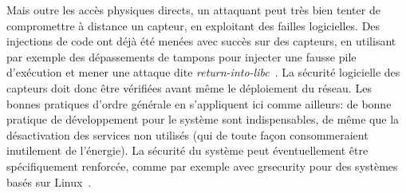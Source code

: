 Mais outre les accès physiques directs, un attaquant peut très bien tenter de compromettre à distance un capteur, en exploitant des failles logicielles.
Des injections de code ont déjà été menées avec succès sur des capteurs, en utilisant par exemple des dépassements de tampons pour injecter une fausse pile d'exécution et mener une attaque dite \textit{return-into-libc}~\cite{FC08}.
La sécurité logicielle des capteurs doit donc être vérifiées avant même le déploiement du réseau.
Les bonnes pratiques d'ordre générale en \secu s'appliquent ici comme ailleurs: de bonne pratique de développement pour le système sont indispensables, de même que la désactivation des services non utilisés (qui de toute façon consommeraient inutilement de l'énergie).
La sécurité du système peut éventuellement être spécifiquement renforcée, comme par exemple avec grsecurity pour des systèmes basés sur Linux~\cite{GFN11}.
